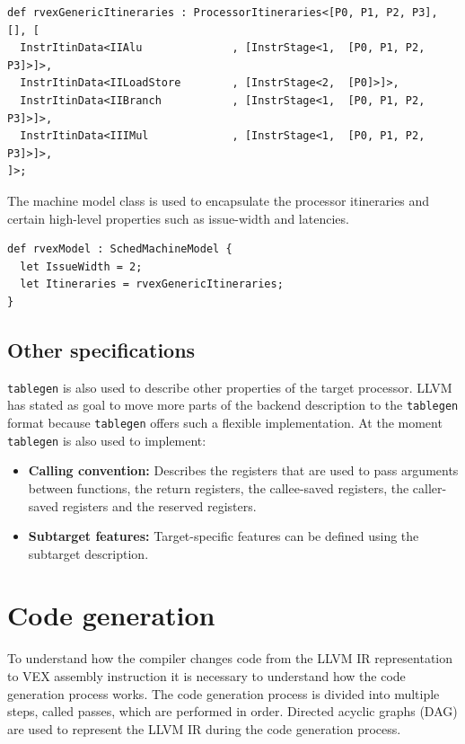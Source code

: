 \begin{lstlisting}[language=tblgen]
def rvexGenericItineraries : ProcessorItineraries<[P0, P1, P2, P3], [], [
  InstrItinData<IIAlu              , [InstrStage<1,  [P0, P1, P2, P3]>]>,
  InstrItinData<IILoadStore        , [InstrStage<2,  [P0]>]>,
  InstrItinData<IIBranch           , [InstrStage<1,  [P0, P1, P2, P3]>]>,
  InstrItinData<IIIMul             , [InstrStage<1,  [P0, P1, P2, P3]>]>,
]>;
\end{lstlisting}

The machine model class is used to encapsulate the processor itineraries and certain high-level properties such as issue-width and latencies.

\begin{lstlisting}[language=tblgen]
def rvexModel : SchedMachineModel {
  let IssueWidth = 2;
  let Itineraries = rvexGenericItineraries;
}
\end{lstlisting}

\subsection{Other specifications}
\texttt{tablegen} is also used to describe other properties of the target processor. LLVM has stated as goal to move more parts of the backend description to the \texttt{tablegen} format because \texttt{tablegen} offers such a flexible implementation. At the moment \texttt{tablegen} is also used to implement:

\begin{itemize}
  \item \textbf{Calling convention:} Describes the registers that are used to pass arguments between functions, the return registers, the callee-saved registers, the caller-saved registers and the reserved registers. 
  \item \textbf{Subtarget features:} Target-specific features can be defined using the subtarget description. 
\end{itemize}

\section{Code generation}
To understand how the compiler changes code from the LLVM IR representation to VEX assembly instruction it is necessary to understand how the code generation process works. The code generation process is divided into multiple steps, called passes, which are performed in order. Directed acyclic graphs (DAG) are used to represent the LLVM IR during the code generation process.

